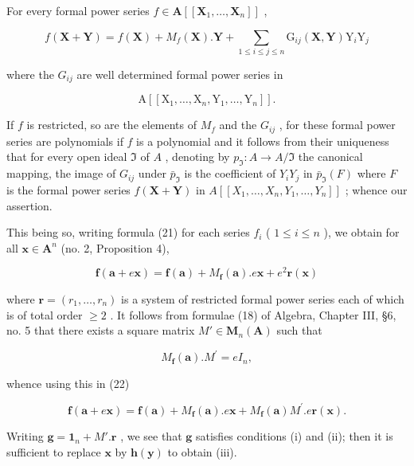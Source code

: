 For every formal power series \(f \in \mathbf{A}[[\mathbf{X}_1, \ldots, \mathbf{X}_n]]\) ,

\[
f (\mathbf {X} + \mathbf {Y}) = f (\mathbf {X}) + M _ {f} (\mathbf {X}). \mathbf {Y} + \sum_ {1 \leqslant i \leqslant j \leqslant n} \mathrm{G} _ {i j} (\mathbf {X}, \mathbf {Y}) \mathrm{Y} _ {i} \mathrm{Y} _ {j}\tag{21}
\]

where the \(G_{ij}\) are well determined formal power series in

\[
\mathrm{A} \left[ \left[ \mathrm{X} _ {1}, \dots , \mathrm{X} _ {n}, \mathrm{Y} _ {1}, \dots , \mathrm{Y} _ {n} \right] \right].
\]

If \(f\) is restricted, so are the elements of \(M_{f}\) and the \(G_{ij}\) , for these formal power series are polynomials if \(f\) is a polynomial and it follows from their uniqueness that for every open ideal \(\Im\) of \(A\) , denoting by \(p_{\Im} \colon A \to A / \Im\) the canonical mapping, the image of \(G_{ij}\) under \(\bar{p}_{\Im}\) is the coefficient of \(Y_{i}Y_{j}\) in \(\bar{p}_{\Im}(F)\) where \(F\) is the formal power series \(f(\mathbf{X} + \mathbf{Y})\) in \(A[[X_1, \ldots, X_n, Y_1, \ldots, Y_n]]\) ; whence our assertion.

This being so, writing formula (21) for each series \(f_{i}\) ( \(1 \leqslant i \leqslant n\) ), we obtain for all \(\mathbf{x} \in \mathbf{A}^n\) (no. 2, Proposition 4),

\[
\mathbf {f} (\mathbf {a} + e \mathbf {x}) = \mathbf {f} (\mathbf {a}) + M _ {\mathbf {f}} (\mathbf {a}). e \mathbf {x} + e ^ {2} \mathbf {r} (\mathbf {x})\tag{22}
\]

where \(\mathbf{r} = (r_1, \ldots, r_n)\) is a system of restricted formal power series each of which is of total order \(\geqslant 2\) . It follows from formulae (18) of Algebra, Chapter III, §6, no. 5 that there exists a square matrix \(M' \in \mathbf{M}_n(\mathbf{A})\) such that

\[
M _ {\mathbf {f}} (\mathbf {a}). M ^ {\prime} = e I _ {n},\tag{23}
\]

whence using this in (22)

\[
\mathbf {f} (\mathbf {a} + e \mathbf {x}) = \mathbf {f} (\mathbf {a}) + M _ {\mathbf {f}} (\mathbf {a}). e \mathbf {x} + M _ {\mathbf {f}} (\mathbf {a}) M ^ {\prime}. e \mathbf {r} (\mathbf {x}).\tag{24}
\]

Writing \(\mathbf{g} = \mathbf{1}_n + M'.\mathbf{r}\) , we see that \(\mathbf{g}\) satisfies conditions (i) and (ii); then it is sufficient to replace \(\mathbf{x}\) by \(\mathbf{h}(\mathbf{y})\) to obtain (iii).

